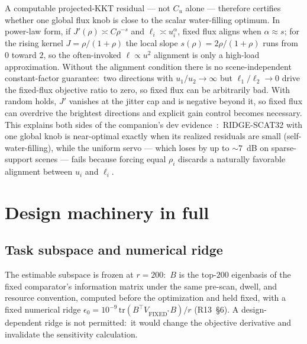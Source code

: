 \documentclass[10pt]{article}
\newcommand{\Cu}{C_{u}}
\begin{document}
A computable projected-KKT residual --- not $\Cu$ alone --- therefore
certifies whether one global flux knob is close to the scalar water-filling
optimum. In power-law form, if $J'(\rho)\asymp C\rho^{-s}$ and
$\ell_i \asymp u_i^{\alpha}$, fixed flux aligns when $\alpha\approx s$; for
the rising kernel $J = \rho/(1+\rho)$ the local slope
$s(\rho) = 2\rho/(1+\rho)$ runs from $0$ toward $2$, so the often-invoked
$\ell \propto u^{2}$ alignment is only a high-load approximation. Without the
alignment condition there is no scene-independent constant-factor
guarantee:\ two directions with $u_1/u_2\to\infty$ but $\ell_1/\ell_2\to0$
drive the fixed-flux objective ratio to zero, so fixed flux can be
arbitrarily bad. With random holds, $J'$ vanishes at the jitter cap and is
negative beyond it, so fixed flux can overdrive the brightest directions and
explicit gain control becomes necessary. This explains both sides of the
companion's dev evidence~\cite{companion}:\ \textsc{RIDGE-SCAT32} with one
global knob is near-optimal exactly when its realized residuals are small
(self-water-filling), while the uniform servo --- which loses by up to
$\sim7$~dB on sparse-support scenes --- fails because forcing equal $\rho_i$
discards a naturally favorable alignment between $u_i$ and $\ell_i$.

\section{Design machinery in full}
\label{sec:s-machinery}

\subsection{Task subspace and numerical ridge}
The estimable subspace is frozen at $r = 200$:\ $B$ is
the top-$200$ eigenbasis of the fixed comparator's information matrix under
the same pre-scan, dwell, and resource convention, computed before the
optimization and held fixed, with a fixed numerical ridge
$\epsilon_0 = 10^{-9}\,\mathrm{tr}(B^{\top}V_{\text{FIXED}^\ast}B)/r$
(R13~\S6). A design-dependent ridge is not permitted:\ it would change the
objective derivative and invalidate the sensitivity calculation.
\end{document}
